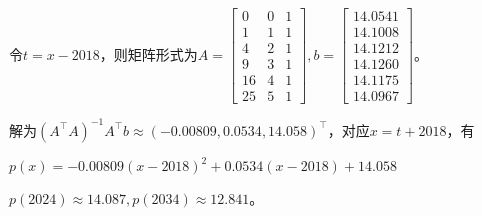     \begin{solution}
        令$t=x-2018$，则矩阵形式为$A=\begin{bmatrix}0&0&1\\1&1&1\\4&2&1\\9&3&1\\16&4&1\\25&5&1\end{bmatrix},b=\begin{bmatrix}14.0541\\14.1008\\14.1212\\14.1260\\14.1175\\14.0967\end{bmatrix}$。

        解为$(A^{\top}A)^{-1}A^{\top}b\approx(-0.00809,0.0534,14.058)^{\top}$，对应$x=t+2018$，有

        $p(x)=-0.00809(x-2018)^2+0.0534(x-2018)+14.058$

        $p(2024)\approx14.087,p(2034)\approx12.841$。
    \end{solution}

